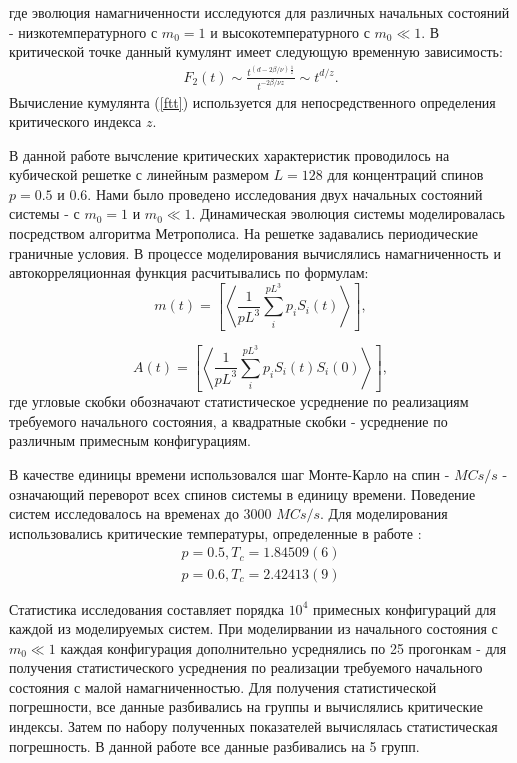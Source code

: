 \documentclass[12pt,a4paper]{article}
\begin{document}
где эволюция намагниченности исследуются для различных начальных состояний - низкотемпературного с $m_0 = 1$ и высокотемпературного с $m_0 \ll 1$. В критической точке данный кумулянт имеет следующую временную зависимость:
\begin{equation} \label{ft_scail}
\begin{split}
F_{2} \left( t \right) \sim \frac{ t^{ \left( d - 2\beta / \nu \right)\frac{1}{z} } }{ t^{-2\beta / \nu z} } \sim t^{d/z} .
\end{split}
\end{equation}
Вычисление кумулянта (\ref{ftt}) используется для непосредственного определения критического индекса $z$.

В данной работе вычсление критических характеристик проводилось на кубической решетке с линейным размером $L = 128$ для концентраций спинов $p = 0.5$ и $0.6$. Нами было проведено исследования двух начальных состояний системы - с $m_0 = 1$ и $m_0 \ll 1$.  Динамическая эволюция системы моделировалась посредством алгоритма Метрополиса. На решетке задавались периодические граничные условия. В процессе моделирования вычислялись намагниченность и автокорреляционная функция расчитывались по формулам:
\begin{equation} \label{m_calc}
m(t)=\left[ \left<  \frac{1}{pL^3} \sum_{i}^{pL^3} p_i {S_i}(t) \right>\right],
\end{equation}

\begin{equation} \label{A_calc}
A(t)=\left[ \left< \frac{1}{pL^3} \sum_{i}^{pL^3} p_i {S_i}(t){S_i}(0) \right>\right],
\end{equation}
где угловые скобки обозначают статистическое усреднение по реализациям требуемого начального состояния, а квадратные скобки - усреднение по различным примесным конфигурациям.

В качестве единицы времени использовался шаг Монте-Карло на спин - $MCs/s$ - означающий переворот всех спинов системы в единицу времени. Поведение систем исследовалось на временах до 3000 $MCs/s$. Для моделирования использовались критические температуры, определенные в работе \cite{lit:Tc}:
\begin{equation} \label{tc}
  \begin{split}
    p = 0.5, T_c = 1.84509(6)  \\
    p = 0.6, T_c = 2.42413(9)
  \end{split}
\end{equation}

Статистика исследования составляет порядка $10^4$ примесных конфигураций для каждой из моделируемых систем. При моделирвании  из начального состояния с $m_0 \ll 1$ каждая конфигурация дополнительно усреднялись по 25 прогонкам - для получения статистического усреднения по реализации требуемого начального состояния с малой намагниченностью. Для получения статистической погрешности, все данные разбивались на группы и вычислялись критические индексы. Затем по набору полученных показателей вычислялась статистическая погрешность. В данной работе все данные разбивались на 5 групп.
\end{document}
